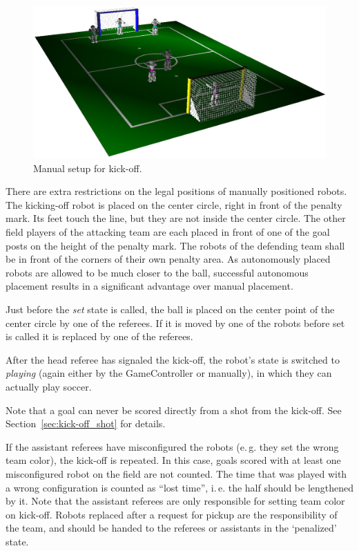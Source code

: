 \documentclass[12pt]{article}
\newcommand{\ie}{\mbox{i.\,e.}\xspace}
\newcommand{\eg}{\mbox{e.\,g.}\xspace}
\begin{document}
\begin{figure}[t]
\centerline{\includegraphics[width=\columnwidth]{figs/manual_placement_2010.png}}
\caption{Manual setup for kick-off.}
\label{fig:ko}
\end{figure}

There are extra restrictions on the legal positions of manually positioned robots. The kicking-off robot is placed on the center circle, right in front of the penalty mark. Its feet touch the line, but they are not inside the center circle. 
The other field players of the attacking team are each placed in front of one of the goal posts on the height of the penalty mark. 
The robots of the defending team shall be in front of the corners of their own penalty area. 
As autonomously placed robots are allowed to be much closer to the ball, successful autonomous placement results in a significant advantage over manual placement.

Just before the \emph{set} state is called, the ball is placed on the center point of the center circle by one of the referees. If it is moved by one of the robots before set is called it is replaced by one of the referees.

After the head referee has signaled the kick-off, the robot's state is switched to \emph{playing} (again either by the GameController or manually), in which they can actually play soccer.

Note that a goal can never be scored directly from a shot from the kick-off. See Section~\ref{sec:kick-off_shot} for details.

If the assistant referees have misconfigured the robots (\eg they set the wrong team color), the kick-off is repeated. In this case, goals scored with at least one misconfigured robot on the field are not counted. The time that was played with a wrong configuration is counted as ``lost time'', \ie the half should be lengthened by it. Note that the assistant referees are only responsible for setting team color on kick-off. Robots replaced after a request for pickup are the responsibility of the team, and should be handed to the referees or assistants in the `penalized' state.
\end{document}
